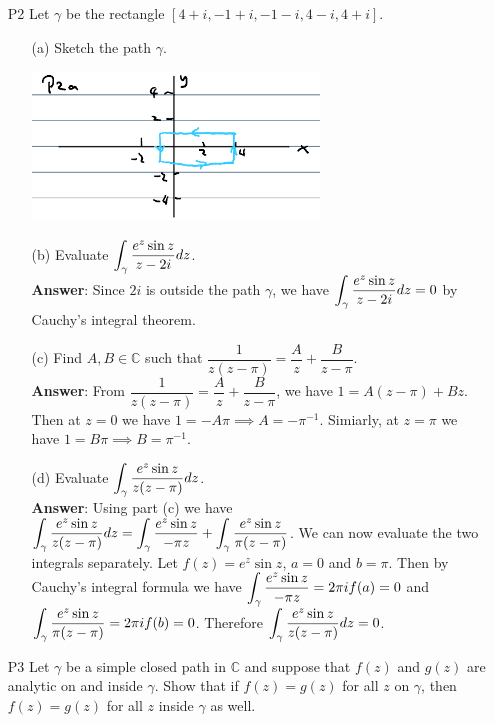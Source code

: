 \documentclass{article}
\begin{document}
\begin{itemize}
      \item [P2] Let $\gamma$ be the rectangle $[4+i,-1+i,-1-i,4-i,4+i]$.
            \begin{itemize}
                  \item [(a)] Sketch the path $\gamma$.
                        \begin{center}
                              \includegraphics[width=3in]{p3a.png}
                        \end{center}
                  \item [(b)] Evaluate $\mathlarger{\int_\gamma\frac{e^z\sin z}{z-2i}dz}$.\\
                        \textbf{Answer}: Since $2i$ is outside the path $\gamma$, we have $\mathlarger{\int_\gamma\frac{e^z\sin z}{z-2i}dz}=0$ by Cauchy's integral theorem.
                  \item [(c)] Find $A,B\in\mathbb{C}$ such that $\dfrac{1}{z(z-\pi)}=\dfrac{A}{z}+\dfrac{B}{z-\pi}$.\\
                        \textbf{Answer}: From $\dfrac{1}{z(z-\pi)}=\dfrac{A}{z}+\dfrac{B}{z-\pi}$, we have $1=A(z-\pi)+Bz$. Then at $z=0$ we have $1=-A\pi\implies A=-\pi^{-1}$. Simiarly, at $z=\pi$ we have $1=B\pi\implies B=\pi^{-1}$.
                  \item [(d)] Evaluate $\mathlarger{\int_\gamma\frac{e^z\sin z}{z(z-\pi)}dz}$.\\
                        \textbf{Answer}: Using part (c) we have $\mathlarger{\int_\gamma\frac{e^z\sin z}{z(z-\pi)}dz=\int_\gamma\frac{e^z\sin z}{-\pi z}+\int_\gamma\frac{e^z\sin z}{\pi(z-\pi)}}$. We can now evaluate the two integrals separately. Let $f(z)=e^z\sin z$, $a=0$ and $b=\pi$. Then by Cauchy's integral formula we have $\mathlarger{\int_\gamma\frac{e^z\sin z}{-\pi z}=2\pi if(a)}=0$ and $\mathlarger{\int_\gamma\frac{e^z\sin z}{\pi(z-\pi)}=2\pi if(b)=0}$. Therefore $\mathlarger{\int_\gamma\frac{e^z\sin z}{z(z-\pi)}dz}=0$.
            \end{itemize}
      \item [P3] Let $\gamma$ be a simple closed path in $\mathbb{C}$ and suppose that $f(z)$ and $g(z)$ are analytic on and inside $\gamma$. Show that if $f(z)=g(z)$ for all $z$ on $\gamma$, then $f(z)=g(z)$ for all $z$ inside $\gamma$ as well.\\

\end{itemize}
\end{document}
